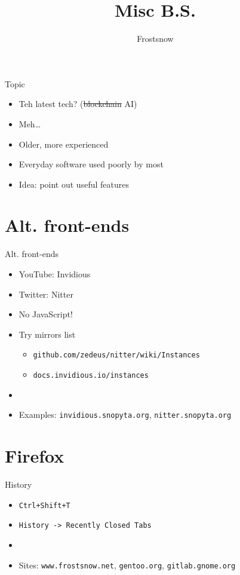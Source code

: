 \documentclass{beamer}
\title{Misc B.S.}
\author{Frostsnow}
\begin{document}
\begin{frame}
  \titlepage
\end{frame}

\begin{frame}{Topic}
\begin{itemize}
	\item Teh latest tech? (\st{blockchain} AI)
	\item Meh\ldots
	\item Older, more experienced
	\item Everyday software used poorly by most
	\item Idea: point out useful features
\end{itemize}
\end{frame}

\section{Alt. front-ends}
\begin{frame}{Alt. front-ends}
\begin{itemize}
	\item YouTube: Invidious
	\item Twitter: Nitter
	\item No JavaScript!
	\item Try mirrors list
	\begin{itemize}
		\item \texttt{github.com/zedeus/nitter/wiki/Instances}
		\item \texttt{docs.invidious.io/instances}
	\end{itemize}
	\item[]
	\item \small Examples: \texttt{invidious.snopyta.org}, \texttt{nitter.snopyta.org}
\end{itemize}
\end{frame}

\section{Firefox}
\begin{frame}{History}
\begin{itemize}
	\item \texttt{Ctrl+Shift+T}
	\item \texttt{History -> Recently Closed Tabs}
	\item[]
	\item \small Sites: \texttt{www.frostsnow.net}, \texttt{gentoo.org}, \texttt{gitlab.gnome.org}
\end{itemize}
\end{frame}
\end{document}
